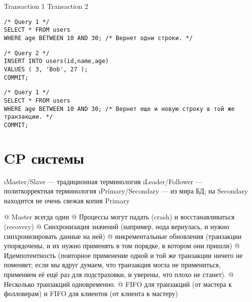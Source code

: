 \begin{minipage}{.45\linewidth}
\hfil Transaction 1 \hfil   \hfil Transaction 2 \hfil
\begin{flushleft}\begin{minipage}{.6\textwidth}
\begin{verbatim}
/* Query 1 */
SELECT * FROM users
WHERE age BETWEEN 10 AND 30; /* Вернет одни строки. */
\end{verbatim}
\end{minipage}\end{flushleft}

\begin{flushright}\begin{minipage}{.6\textwidth}
\begin{verbatim}
/* Query 2 */
INSERT INTO users(id,name,age)
VALUES ( 3, 'Bob', 27 );
COMMIT;
\end{verbatim}
\end{minipage}
\end{flushright}

\begin{flushleft}\begin{minipage}{.6\textwidth}
\begin{verbatim}
/* Query 1 */
SELECT * FROM users
WHERE age BETWEEN 10 AND 30; /* Вернет еще и новую строку в той же транзакции. */
COMMIT;
\end{verbatim}
\end{minipage}\end{flushleft}
\end{minipage}
    
\section{CP системы}

\begin{enumerate}
\i Master/Slave --- традиционная терминология
\i Leader/Follower --- политкорректная терминология
\i Primary/Secondary --- из мира БД; на Secondary находится не очень свежая копия Primary
\end{enumerate}

\begin{el}[ol]
@ Master всегда один
@ Процессы могут падать (crash) и восстанавливаться (recovery)
@ Синхронизация значений (например, нода вернулась, и нужно синхронизировать данные на ней)
@ инкрементальные обновления (транзакции упорядочены, и их нужно применять в том порядке, в котором они пришли)
@ Идемпотентность (повторное применение одной и той же транзакции ничего не поменяет; если мы вдруг думаем, что транзакция могла не примениться, применяем её ещё раз для подстраховки, и уверены, что плохо не станет).
@ Несколько транзакций одновременно.
@ FIFO для транзакций (от мастера к фолловерам) и FIFO для клиентов (от клиента к мастеру)
\end{el}

